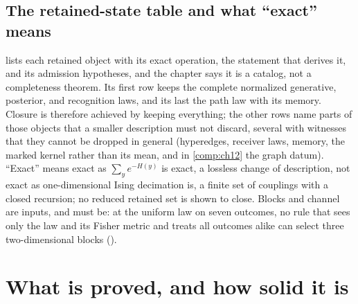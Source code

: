 \subsection{The retained-state table and what ``exact'' means}

 lists each retained object with its exact operation, the statement that
derives it, and its admission hypotheses, and the chapter says it is a catalog, not a completeness
theorem. Its first row keeps the complete normalized generative, posterior, and recognition laws, and
its last the path law with its memory. Closure is therefore achieved by keeping everything; the other rows
name parts of those objects that a smaller description must not discard, several with witnesses that
they cannot be dropped in general (hyperedges, receiver laws, memory, the marked kernel rather than its
mean, and in \cref{comp:ch12} the graph datum). ``Exact'' means exact as $\sum_ye^{-H(y)}$ is exact, a
lossless change of description, not exact as one-dimensional Ising decimation is, a finite set of
couplings with a closed recursion; no reduced retained set is shown to close. Blocks and channel are
inputs, and must be: at the uniform law on seven outcomes, no rule that sees only the law and its
Fisher metric and treats all outcomes alike can select three two-dimensional blocks
().

\section{What is proved, and how solid it is}
\label{comp:ch11-scorecard}

